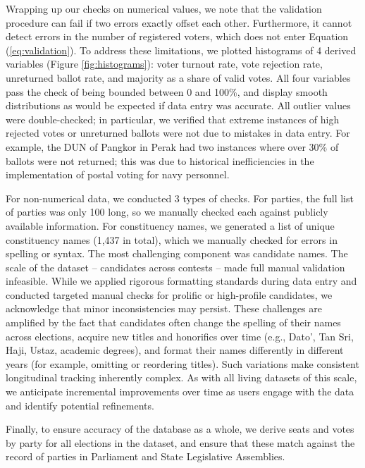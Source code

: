\documentclass[11pt]{article}
\begin{document}
Wrapping up our checks on numerical values, we note that the validation procedure can fail if two errors exactly offset each other. Furthermore, it cannot detect errors in the number of registered voters, which does not enter Equation (\ref{eq:validation}). To address these limitations, we plotted histograms of 4 derived variables (Figure \ref{fig:histograms}): voter turnout rate, vote rejection rate, unreturned ballot rate, and majority as a share of valid votes. All four variables pass the check of being bounded between 0 and 100\%, and display smooth distributions as would be expected if data entry was accurate. All outlier values were double-checked; in particular, we verified that extreme instances of high rejected votes or unreturned ballots were not due to mistakes in data entry. For example, the DUN of Pangkor in Perak had two instances where over 30\% of ballots were not returned; this was due to historical inefficiencies in the implementation of postal voting for navy personnel\cite{junid2019battle}.

For non-numerical data, we conducted 3 types of checks. For parties, the full list of parties was only 100 long, so we manually checked each against publicly available information. For constituency names, we generated a list of unique constituency names (1,437 in total), which we manually checked for errors in spelling or syntax. The most challenging component was candidate names. The scale of the dataset -- \TOTALBALLOTS\space candidates across \TOTALCONTESTS\space contests -- made full manual validation infeasible. While we applied rigorous formatting standards during data entry and conducted targeted manual checks for prolific or high-profile candidates, we acknowledge that minor inconsistencies may persist. These challenges are amplified by the fact that candidates often change the spelling of their names across elections, acquire new titles and honorifics over time (e.g., Dato', Tan Sri, Haji, Ustaz, academic degrees), and format their names differently in different years (for example, omitting or reordering titles). Such variations make consistent longitudinal tracking inherently complex. As with all living datasets of this scale, we anticipate incremental improvements over time as users engage with the data and identify potential refinements.

Finally, to ensure accuracy of the database as a whole, we derive seats and votes by party for all elections in the dataset, and ensure that these match against the record of parties in Parliament and State Legislative Assemblies.
\end{document}

